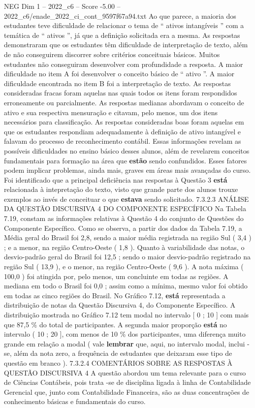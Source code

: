 \begin{textsample}{NEG Dim 1 – 2022\_c6 – Score -5.00 – 2022\_c6/enade\_2022\_ci\_cont\_9597f67a94.txt}
Ao que parece, a maioria dos estudantes teve dificuldade de relacionar o tema de “ ativos intangíveis ” com a temática de “ ativos ”, já que a definição solicitada era a mesma.
As respostas demonstraram que os estudantes têm dificuldade de interpretação de texto, além de não conseguirem discorrer sobre critérios conceituais básicos.
Muitos estudantes não conseguiram desenvolver com profundidade a resposta.
A maior dificuldade no item A foi desenvolver o conceito básico de “ ativo ”.
A maior dificuldade encontrada no item B foi a interpretação de texto.
As respostas consideradas fracas foram aquelas nas quais todos os itens foram respondidos erroneamente ou parcialmente.
As respostas medianas abordavam o conceito de ativo e sua respectiva mensuração e citavam, pelo menos, um dos itens necessários para classificação.
As respostas consideradas boas foram aquelas em que os estudantes respondiam adequadamente à definição de ativo intangível e falavam do processo de reconhecimento contábil.
Essas informações revelam as possíveis dificuldades no ensino básico desses alunos, além de revelarem conceitos fundamentais para formação na área que \textbf{estão} sendo confundidos.
Esses fatores podem implicar problemas, ainda mais, graves em áreas mais avançadas do curso.
Foi identificado que a principal deficiência nas respostas à Questão 3 \textbf{está} relacionada à intepretação do texto, visto que grande parte dos alunos trouxe exemplos ao invés de conceituar o que \textbf{estava} sendo solicitado. 7.3.2.3 ANÁLISE DA QUESTÃO DISCURSIVA 4 DO COMPONENTE ESPECÍFICO Na Tabela 7.19, constam as informações relativas à Questão 4 do conjunto de Questões do Componente Específico.
Como se observa, a partir dos dados da Tabela 7.19, a Média geral do Brasil foi 2,8, sendo a maior média registrada na região Sul ( 3,4 ) ; e a menor, na região Centro-Oeste ( 1,8 ).
Quanto à variabilidade das notas, o desvio-padrão geral do Brasil foi 12,5 ; sendo o maior desvio-padrão registrado na região Sul ( 13,9 ), e o menor, na região Centro-Oeste ( 9,6 ).
A nota máxima ( 100,0 ) foi atingida por, pelo menos, um concluinte em todas as regiões.
A mediana em todo o Brasil foi 0,0 ; assim como a mínima, mesmo valor foi obtido em todas as cinco regiões do Brasil.
No Gráfico 7.12, \textbf{está} representada a distribuição de notas da Questão Discursiva 4, do Componente Específico.
A distribuição mostrada no Gráfico 7.12 tem modal no intervalo [ 0 ; 10 ] com mais que 87,5 \% do total de participantes.
A segunda maior proporção \textbf{está} no intervalo ( 10 ; 20 ], com menos de 10 \% dos participantes, uma diferença muito grande em relação a modal ( vale \textbf{lembrar} que, aqui, no intervalo modal, inclui -se, além da nota zero, a frequência de estudantes que deixaram esse tipo de questão em branco ). 7.3.2.4 COMENTÁRIOS SOBRE AS RESPOSTAS À QUESTÃO DISCURSIVA 4 A questão abordou um tema relevante para o curso de Ciências Contábeis, pois trata -se de disciplina ligada à linha de Contabilidade Gerencial que, junto com Contabilidade Financeira, são as duas concentrações de conhecimento básicas e fundamentais do curso.

\end{textsample}

